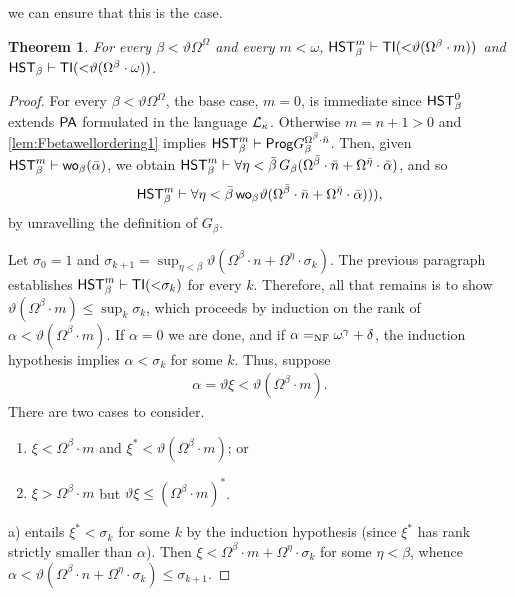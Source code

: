 \documentclass[UKenglish,cleveref,DIV=12]{scrartcl}
\newtheorem{theorem}{Theorem}
\theoremstyle{definition}
\theoremstyle{definition}
\begin{document}
we can ensure that this is the case. %
\begin{theorem}\label{thm:Fbetalowerbound}
  For every $\beta<\vartheta\Omega^\Omega$ and every $m<\omega$,
  $\mathsf{HST}_\beta^{m}\vdash\mathsf{TI}(\mathord<\vartheta(\Omega^\beta\cdot m))$ and $\mathsf{HST}_\beta\vdash\mathsf{TI}(\mathord<\vartheta(\Omega^\beta\cdot\omega))$.
\end{theorem}
\begin{proof}
For every $\beta<\vartheta\Omega^\Omega$, the base case, $m=0$, is immediate
since $\mathsf{HST}_\beta^0$ extends $\mathsf{PA}$ formulated in the language $\mathcal{L}_\kappa$.
Otherwise $m=n+1>0$ and \cref{lem:Fbetawellordering1} implies $\mathsf{HST}_\beta^m\vdash\mathsf{Prog}
G_\beta^{\Omega^{\bar\beta}\cdot\bar n}$. Then, given $\mathsf{HST}_\beta^m\vdash
\mathsf{wo}_\beta(\bar \alpha)$, we obtain $\mathsf{HST}_\beta^m\vdash
\forall\eta<\bar\beta\,G_\beta(\Omega^{\bar\beta}\cdot\bar
n+\Omega^{\bar\eta}\cdot\bar\alpha)$, and so
\begin{align*}
  \mathsf{HST}_\beta^m\vdash\forall\eta<\bar\beta\,\mathsf{wo}_\beta\vartheta(\Omega^{\bar \beta}\cdot\bar
  n+\Omega^{\bar \eta}\cdot\bar\alpha))),
\end{align*}
by unravelling the definition of $G_\beta$.

Let $\sigma_0=1$ and $\sigma_{k+1}=\sup_{\eta<\beta}\vartheta(\Omega^{\beta}\cdot
n+\Omega^\eta\cdot\sigma_k)$. The previous paragraph establishes $\mathsf{HST}_\beta^m\vdash
\mathsf{TI}(\mathord<\sigma_k)$ for every $k$. Therefore, all that remains is to show
$\vartheta(\Omega^{\beta}\cdot m)\le\sup_k\sigma_k$, which proceeds by induction
on the rank of $\alpha<\vartheta(\Omega^{\beta}\cdot m)$. If $\alpha=0$ we are
done, and if $\alpha=_{\mathrm{NF}}\omega^\gamma+\delta$, the induction hypothesis implies
$\alpha<\sigma_k$ for some $k$. Thus, suppose
\begin{gather*}
  \alpha=\vartheta\xi<\vartheta(\Omega^{\beta}\cdot m).
\end{gather*}
There are two cases to consider.
\begin{enumerate}
 \item $\xi<\Omega^{\beta}\cdot m$ and $\xi^*<\vartheta(\Omega^{\beta}\cdot m)$; or
 \item $\xi>\Omega^{\beta}\cdot m$ but $\vartheta\xi\le(\Omega^{\beta}\cdot m)^*$.
\end{enumerate}
a) entails $\xi^*<\sigma_k$ for some $k$ by the induction hypothesis
(since $\xi^*$ has rank strictly smaller than $\alpha$). Then
$\xi<\Omega^{\beta}\cdot m+\Omega^\eta\cdot\sigma_k$ for some $\eta<\beta$, whence
$\alpha<\vartheta(\Omega^{\beta}\cdot n+\Omega^\eta\cdot\sigma_k)\le\sigma_{k+1}$.


\end{proof}
\end{document}
